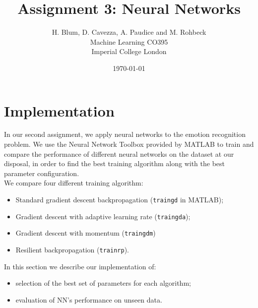 \documentclass{article}
\begin{document}
\author{H. Blum, D. Cavezza, A. Paudice and M. Rohbeck\\
 Machine Learning CO395\\
  Imperial College London}
\date{\today}
\title{Assignment 3: Neural Networks}
\maketitle

\section{Implementation}
In our second assignment, we apply neural networks to the emotion recognition problem. We use the Neural Network Toolbox provided by MATLAB to train and compare the performance of different neural networks on the dataset at our disposal, in order to find the best training algorithm along with the best parameter configuration.\\
We compare four different training algorithm:
\begin{itemize}
	\item Standard gradient descent backpropagation (\verb$traingd$ in MATLAB);
	\item Gradient descent with adaptive learning rate (\verb$traingda$);
	\item Gradient descent with momentum (\verb$traingdm$)
	\item Resilient backpropagation (\verb$trainrp$).
\end{itemize}
In this section we describe our implementation of:
\begin{itemize}
	\item selection of the best set of parameters for each algorithm;
	\item evaluation of NN's performance on unseen data.
\end{itemize}
\end{document}
